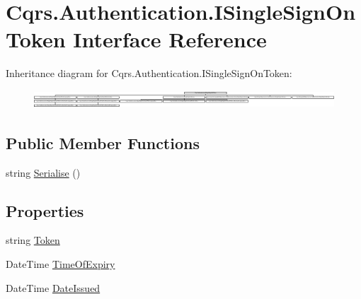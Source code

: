 \hypertarget{interfaceCqrs_1_1Authentication_1_1ISingleSignOnToken}{}\section{Cqrs.\+Authentication.\+I\+Single\+Sign\+On\+Token Interface Reference}
\label{interfaceCqrs_1_1Authentication_1_1ISingleSignOnToken}
Inheritance diagram for Cqrs.\+Authentication.\+I\+Single\+Sign\+On\+Token\+:\begin{figure}[H]
\begin{center}
\leavevmode
\includegraphics[height=0.686695cm]{interfaceCqrs_1_1Authentication_1_1ISingleSignOnToken}
\end{center}
\end{figure}
\subsection*{Public Member Functions}
\begin{DoxyCompactItemize}
\item 
string \hyperlink{interfaceCqrs_1_1Authentication_1_1ISingleSignOnToken_af34e8c0b052865d687064d3381bfbcdb_af34e8c0b052865d687064d3381bfbcdb}{Serialise} ()
\end{DoxyCompactItemize}
\subsection*{Properties}
\begin{DoxyCompactItemize}
\item 
string \hyperlink{interfaceCqrs_1_1Authentication_1_1ISingleSignOnToken_aba74aff1a43375dce8d80fa94a94a57b_aba74aff1a43375dce8d80fa94a94a57b}{Token}
\item 
Date\+Time \hyperlink{interfaceCqrs_1_1Authentication_1_1ISingleSignOnToken_a50af484569cc78f88acb01f1938a7cd8_a50af484569cc78f88acb01f1938a7cd8}{Time\+Of\+Expiry}
\item 
Date\+Time \hyperlink{interfaceCqrs_1_1Authentication_1_1ISingleSignOnToken_a0c41d76beea893838e556fba8dbc59db_a0c41d76beea893838e556fba8dbc59db}{Date\+Issued}
\end{DoxyCompactItemize}


